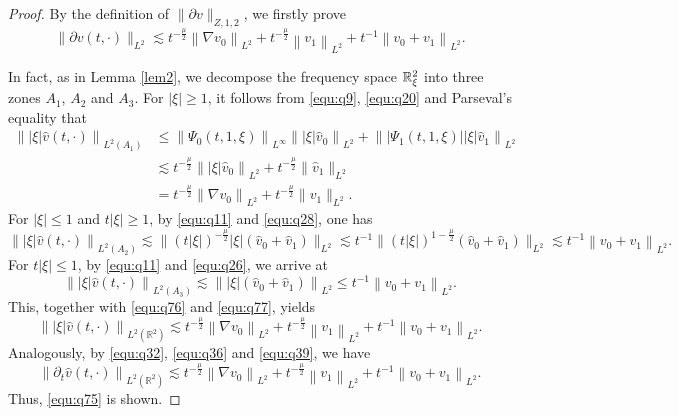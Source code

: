 \documentclass[10pt,a4paper]{amsart}
\newcommand{\R}{\mathbb R}
\newcommand{\f}{\frac}
\newcommand{\p}{\partial}
\begin{document}
\begin{proof}
By the definition of $\|\p v\|_{Z, 1, 2}$,  we firstly prove
\begin{equation}\label{equ:q75}
\|\p v(t, \cdot)\|_{L^2} \lesssim t^{-\f{\mu}{2}}\left\|\nabla v_0\right\|_{L^ 2}+t^{-\f{\mu}{2}}\left\| v_1\right\|_{L^ 2}+t^{-1}\left\|v_0+v_1\right\|_{L^ 2}.
\end{equation}

In fact, as in Lemma \ref{lem2}, we decompose the frequency space $\Bbb R_{\xi}^2$ into three zones
$A_1$, $A_2$ and $A_3$. For $|\xi|\geq 1$, it follows from \eqref{equ:q9}, \eqref{equ:q20} and Parseval's equality that
\begin{equation}\label{equ:q76}
\begin{aligned}
\left\||\xi|\hat{v}(t, \cdot)\right\|_{L^2(A_1)} & \leq\left\|  \Psi_{0}(t, 1, \xi)\right\|_{L^{\infty}}\left\||\xi|\hat{v}_{0}\right\|_{L^{2}}+\left\||\Psi_{1 }(t, 1, \xi)||\xi|\hat{v}_{1}\right\|_{L^{2}} \\
& \lesssim t^{-\frac{\mu}{2}}\left\||\xi| \hat{v}_{0}\right\|_{L^{2}}+t^{-\f{\mu}{2}} \|\hat{v}_{1}\|_{L^{2}}\\
& = t^{-\frac{\mu}{2}}\left\|\nabla v_{0}\right\|_{L^{2}}+t^{-\f{\mu}{2}} \|v_{1}\|_{L^{2}}.
\end{aligned}
\end{equation}
For $|\xi|\leq1$ and $t|\xi|\geq1$, by \eqref{equ:q11} and \eqref{equ:q28}, one has
\begin{equation}\label{equ:q77}
\left\||\xi|\hat{v}(t, \cdot)\right\|_{L^2(A_2)}  \lesssim \big\|(t|\xi|)^{-\f{\mu}{2}}|\xi|(\hat{v}_{0}+\hat{v}_{1})\big\|_{L^{2}}
\lesssim t^{-1} \big\|(t|\xi|)^{1-\f{\mu}{2}}(\hat{v}_{0}+\hat{v}_{1})\big\|_{L^{2}} \lesssim t^{-1}\left\|v_0+v_1\right\|_{L^ 2}.
\end{equation}
For $t|\xi|\leq1$, by \eqref{equ:q11} and \eqref{equ:q26}, we arrive at
$$
\left\||\xi|\hat{v}(t, \cdot)\right\|_{L^2(A_3)} \lesssim \left\||\xi|(\hat{v}_{0}+\hat{v}_{1})\right\|_{L^{2}}  \leq t^{-1}\left\|v_{0}+v_{1}\right\|_{L^{2}}.
$$
This, together with \eqref{equ:q76} and \eqref{equ:q77}, yields
$$
\left\||\xi|\hat{v}(t, \cdot)\right\|_{L^2(\R^2)}\lesssim t^{-\f{\mu}{2}}\left\|\nabla v_0\right\|_{L^ 2}+t^{-\f{\mu}{2}}\left\| v_1\right\|_{L^2}+t^{-1}\left\|v_0+v_1\right\|_{L^ 2}.
$$
Analogously, by \eqref{equ:q32}, \eqref{equ:q36} and \eqref{equ:q39}, we have
$$
\left\|\p_t\hat{v}(t, \cdot)\right\|_{L^2(\R^2)}\lesssim t^{-\f{\mu}{2}}\left\|\nabla v_0\right\|_{L^ 2}+t^{-\f{\mu}{2}}\left\| v_1\right\|_{L^ 2}+t^{-1}\left\|v_0+v_1\right\|_{L^ 2}.
$$
Thus, \eqref{equ:q75} is shown.


\end{proof}
\end{document}
